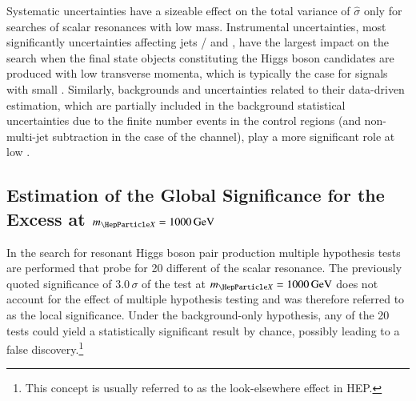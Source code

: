 Systematic uncertainties have a sizeable effect on the total variance
of $\hat{\sigma}$ only for searches of scalar resonances with low
mass. Instrumental uncertainties, most significantly uncertainties
affecting jets / \pTmissAbs and \tauhadvis, have the largest impact on
the search when the final state objects constituting the Higgs boson
candidates are produced with low transverse momenta, which is
typically the case for signals with small \mX. Similarly,
\faketauhadvis backgrounds and uncertainties related to their
data-driven estimation, which are partially included in the background
statistical uncertainties due to the finite number events in the
control regions (and non-multi-jet subtraction in the case of the
\hadhad channel), play a more significant role at low \mX.




\subsection{Estimation of the Global Significance for the Excess at
  $\mX = \SI{1000}{\GeV}$}%
\label{sec:global_significance}


In the search for resonant Higgs boson pair production multiple
hypothesis tests are performed that probe for 20 different \mX of the
scalar resonance. The previously quoted significance of $3.0\,\sigma$ of
the test at $\mX = \SI{1000}{\GeV}$ does not account for the effect of
multiple hypothesis testing and was therefore referred to as the local
significance. Under the background-only hypothesis, any of the 20
tests could yield a statistically significant result by chance,
possibly leading to a false discovery.\footnote{This concept is usually
  referred to as the look-elsewhere effect in HEP.}

